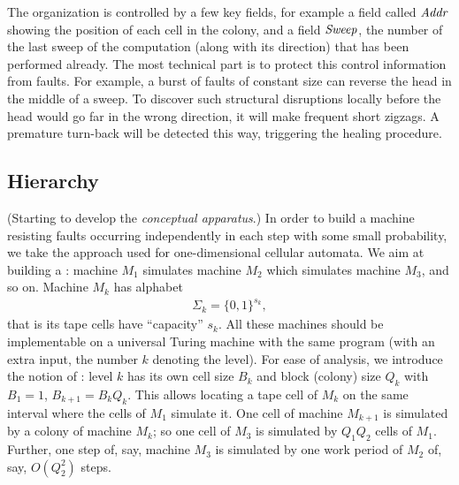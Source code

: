 \documentclass[11pt]{memoir}
\theoremstyle{definition} %
\newcommand{\fld}[1]{\ensuremath{\textit{#1\/}}}
\def\B{B}
\newcommand{\Q}{Q} %
\newcommand{\Addr}{\fld{Addr}}
\newcommand{\Sweep}{\fld{Sweep}} %
\begin{document}
The organization is controlled by a few key fields, for example a field
called \( \Addr \) showing the position of each cell in the colony, and a field
\( \Sweep \), the number of the last sweep of the computation (along with its direction)
that has been performed already.
The most technical part is to protect this control information from faults.
For example, a burst of faults of constant size can reverse the head in the middle of a sweep.
To discover such structural disruptions locally before
the head would go far in the wrong direction, it will make frequent short zigzags.
A premature turn-back will be detected this way, triggering the healing procedure.


\subsection{Hierarchy}\label{sec:hier}

(Starting to develop the \emph{conceptual apparatus}.)
In order to build a machine resisting faults 
occurring independently in each step with some small probability,
we take the approach used for one-dimensional cellular automata.
We aim at building a :
machine \( M_{1} \) simulates machine \( M_{2} \) which simulates machine \( M_{3} \), and so on.
Machine \( M_{k} \) has alphabet
\begin{align}\label{eq:Sigma_k}
   \Sigma_{k}=\{0,1\}^{s_{k}},
\end{align}
that is its tape cells have ``capacity'' \( s_{k} \).
All these machines should be implementable on a universal Turing machine with
the same program (with an extra input, the number \( k \) denoting the level).
For ease of analysis, we introduce the notion of :
level \( k \) has its own cell size \( \B_{k} \) and block (colony) size \( \Q_{k} \)
with \( B_{1}=1 \), \( \B_{k+1}=\B_{k}\Q_{k} \).
This allows
locating a tape cell of \( M_{k} \) on the same interval where the cells of \( M_{1} \) simulate it.
One cell of machine \( M_{k+1} \) is simulated by a colony of machine \( M_{k} \);
so one cell of \( M_{3} \) is simulated by \( \Q_{1}\Q_{2} \) cells of \( M_{1} \).
Further, one step of, say, machine \( M_{3} \) is simulated by one
work period of \( M_{2} \) of, say, \( O(\Q_{2}^{2}) \) steps.
\end{document}
